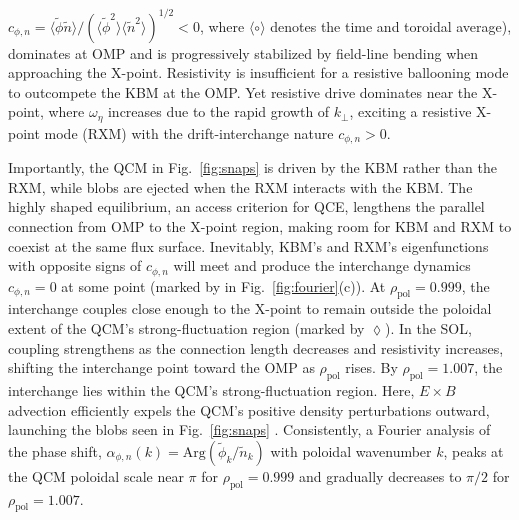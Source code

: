 \documentclass[aps,prl,twocolumn,superscriptaddress]{revtex4-2}
\def  \rpol {\rho_\mathrm{pol}}
\begin{document}
$c_{\phi,n}=\langle\tilde{\phi}\tilde{n}\rangle/(\langle\tilde{\phi}^2\rangle\langle\tilde{n}^2\rangle)^{1/2}<0$, where $\langle \circ \rangle$ denotes the time and toroidal average), dominates at OMP and is progressively stabilized by field-line bending when approaching the X-point.
Resistivity is insufficient for a resistive ballooning mode to outcompete the KBM at the OMP.
Yet resistive drive dominates near the X-point, where $\omega_\eta$ increases due to the rapid growth of $k_\perp$, exciting a resistive X-point mode (RXM) \cite{MyraDippolito2000,mazurenko2002experimental} with the drift-interchange nature $c_{\phi,n}>0$.

{Importantly, the QCM in Fig.~\ref{fig:snaps} is driven by the KBM rather than the RXM, while blobs are ejected when the RXM interacts with the KBM.}
The highly shaped equilibrium, an access criterion for QCE, lengthens the parallel connection from OMP to the X-point region, making room for KBM and RXM to coexist at the same flux surface.
Inevitably, KBM's and RXM's eigenfunctions with opposite signs of $c_{\phi,n}$ will meet and produce the interchange dynamics $c_{\phi,n}=0$ at some point (marked by  in Fig.~\ref{fig:fourier}(c)).
At $\rpol=0.999$, the interchange couples close enough to the X-point to remain outside the poloidal extent of the QCM’s strong-fluctuation region (marked by $\lozenge$).
In the SOL, coupling strengthens as the connection length decreases and resistivity increases, shifting the interchange point toward the OMP as $\rpol$ rises.
By $\rpol=1.007$, the interchange lies within the QCM’s strong-fluctuation region.
Here, $E\times B$ advection efficiently expels the QCM’s positive density perturbations outward, launching the blobs seen in Fig.~\ref{fig:snaps} \cite{krasheninnikov2001scrape,d2011convective}.
Consistently, a Fourier analysis of the phase shift,  $\alpha_{\phi,n}(k)=\mathrm{Arg}(\tilde{\phi}_k/\tilde{n}_k)$ with poloidal wavenumber $k$, peaks at the QCM poloidal scale near $\pi$ for $\rpol=0.999$ and gradually decreases to $\pi/2$ for $\rpol=1.007$.
\end{document}
